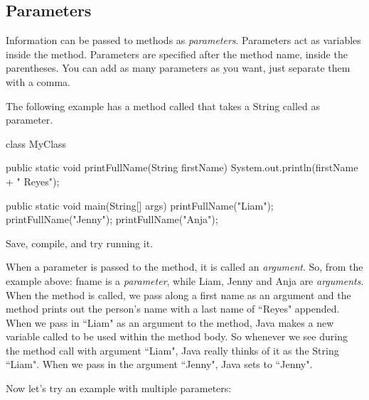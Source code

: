 
\subsection{Parameters} 

Information can be passed to methods as \emph{parameters}. Parameters act as variables inside the method. Parameters are specified after the method name, inside the parentheses. You can add as many parameters as you want, just separate them with a comma.

The following example has a method called  that takes a String called  as parameter. 

\begin{code}
class MyClass {
  public static void printFullName(String firstName) {
    System.out.println(firstName + " Reyes");
  }

  public static void main(String[] args) {
    printFullName("Liam");
    printFullName("Jenny");
    printFullName("Anja");
  }
}
\end{code}

Save, compile, and try running it. 

When a parameter is passed to the method, it is called an \emph{argument}. So, from the example above: fname is a \emph{parameter}, while Liam, Jenny and Anja are \emph{arguments}. When the method is called, we pass along a first name as an argument and the method prints out the person's name with a last name of ``Reyes" appended. When we pass in ``Liam" as an argument to the  method, Java makes a new variable called  to be used within the  method body. So whenever we see  during the method call with argument ``Liam", Java really thinks of it as the String ``Liam". When we pass in the argument ``Jenny", Java sets  to ``Jenny". 

Now let's try an example with multiple parameters:

